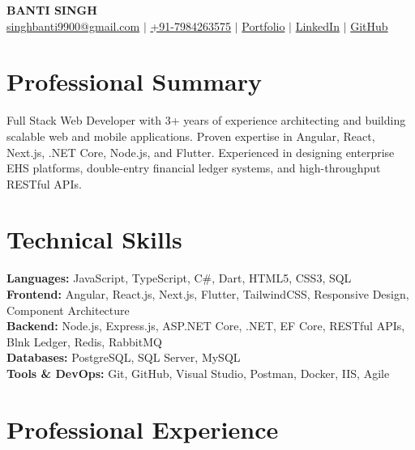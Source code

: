 \documentclass[11pt,letterpaper]{article}
\begin{document}
\begin{center}
    {\LARGE\textbf{BANTI SINGH}} \\
    \vspace{3pt}
    \href{mailto:singhbanti9900@gmail.com}{singhbanti9900@gmail.com} $|$ 
    \href{tel:+917984263575}{+91-7984263575} $|$ 
    \href{https://banti-singh.netlify.app/}{Portfolio} $|$ 
    \href{https://linkedin.com/in/banti-singh-b16504273}{LinkedIn} $|$ 
    \href{https://github.com/bantisingh-rgb}{GitHub}
\end{center}

\vspace{-8pt}

\section{Professional Summary}
Full Stack Web Developer with 3+ years of experience architecting and building scalable web and mobile applications. Proven expertise in Angular, React, Next.js, .NET Core, Node.js, and Flutter. Experienced in designing enterprise EHS platforms, double-entry financial ledger systems, and high-throughput RESTful APIs.

\section{Technical Skills}
\textbf{Languages:} JavaScript, TypeScript, C\#, Dart, HTML5, CSS3, SQL \\
\textbf{Frontend:} Angular, React.js, Next.js, Flutter, TailwindCSS, Responsive Design, Component Architecture \\
\textbf{Backend:} Node.js, Express.js, ASP.NET Core, .NET, EF Core, RESTful APIs, Blnk Ledger, Redis, RabbitMQ \\
\textbf{Databases:} PostgreSQL, SQL Server, MySQL \\
\textbf{Tools \& DevOps:} Git, GitHub, Visual Studio, Postman, Docker, IIS, Agile \\

\section{Professional Experience}
\end{document}
